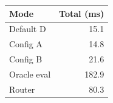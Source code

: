 \begin{tabular}{lr}
\toprule
Mode & Total (ms) \\
\midrule
Default D & 15.1 \\
Config A & 14.8 \\
Config B & 21.6 \\
Oracle eval & 182.9 \\
Router & 80.3 \\
\bottomrule
\end{tabular}
